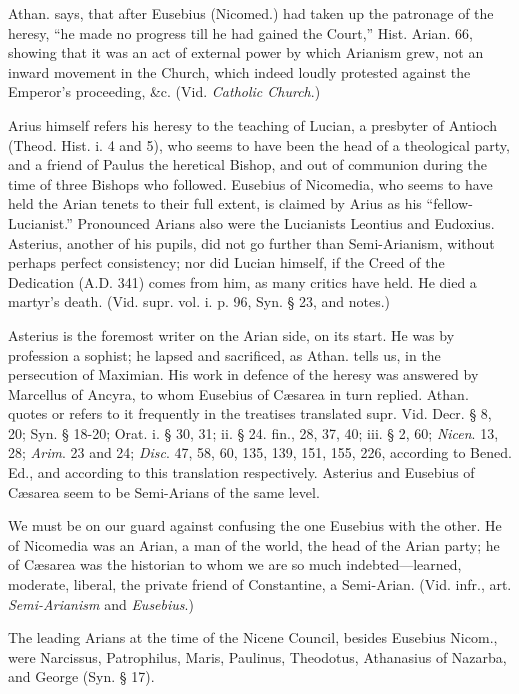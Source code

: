 Athan. says, that after Eusebius (Nicomed.) had
taken up the patronage of the heresy, ``he made no progress till he had
gained the Court,'' Hist. Arian. 66, showing that it was an act of
external power by which Arianism grew, not an inward movement in the
Church, which indeed loudly protested against the Emperor's
proceeding, \&c. (Vid. \emph{Catholic Church}.)


Arius himself refers his heresy to the teaching
of Lucian, a presbyter of Antioch (Theod. Hist. i. 4 and 5), who
seems to have been the head of a theological party, and a friend of
Paulus the heretical Bishop, and out of communion during the time of
three Bishops who followed. Eusebius of Nicomedia, who seems to have
held the Arian tenets to their full extent, is claimed by Arius as his
``fellow-Lucianist.'' Pronounced Arians also were the Lucianists
Leontius and Eudoxius. Asterius, another of his pupils, did not go
further than Semi-Arianism, without perhaps perfect consistency; nor
did Lucian himself, if the Creed of the Dedication (A.D.
341) comes from him, as many critics have held. He died a martyr's
death. (Vid. supr. vol. i. p. 96, Syn. § 23, and notes.)

Asterius is the foremost writer on the Arian
side, on its start. He was by profession a sophist; he lapsed and
sacrificed, as Athan. tells us, in the persecution of Maximian. His
work in defence of the heresy was answered by Marcellus of Ancyra, to
whom Eusebius of Cæsarea in turn replied. Athan. quotes or refers to
it frequently in the treatises translated supr. Vid. Decr. § 8, 20;
Syn. § 18-20; Orat. i. § 30, 31; ii. § 24. fin., 28, 37, 40; iii.
§ 2, 60; \emph{Nicen}. 13, 28; \emph{Arim}. 23 and 24; \emph{Disc}. 47, 58,
60, 135, 139, 151, 155, 226, according to Bened. Ed., and according to
this translation respectively. Asterius and Eusebius of Cæsarea seem
to be Semi-Arians of the same level.

We must be on our guard against confusing the one
Eusebius with the other. He of Nicomedia was an Arian, a man of the
world, the head of the Arian party; he of Cæsarea was the historian
to whom we are so much indebted—learned, moderate, liberal, the private friend of Constantine, a Semi-Arian. (Vid. infr., art. \emph{Semi-Arianism}
and \emph{Eusebius}.)

The leading Arians at the time of the Nicene
Council, besides Eusebius Nicom., were Narcissus, Patrophilus, Maris,
Paulinus, Theodotus, Athanasius of Nazarba, and George (Syn. § 17).

